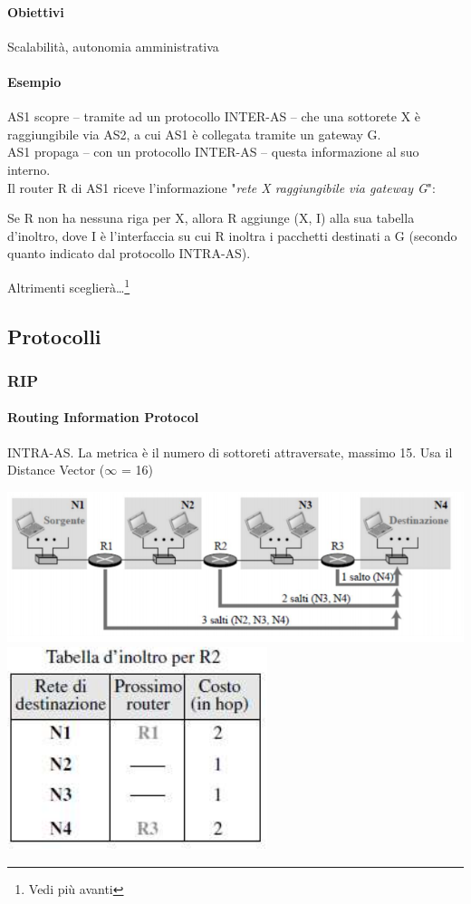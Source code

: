 \documentclass[10pt]{article}
\begin{document}
\paragraph{Obiettivi} Scalabilità, autonomia amministrativa
\paragraph{Esempio} AS1 scopre -- tramite ad un protocollo INTER-AS -- che una sottorete X è raggiungibile via AS2, a cui AS1 è collegata tramite un gateway G.\\
AS1 propaga -- con un protocollo INTER-AS -- questa informazione al suo interno.\\
Il router R di AS1 riceve l'informazione "\textit{rete X raggiungibile via gateway G}":

Se R non ha nessuna riga per X, allora R aggiunge (X, I) alla sua tabella d'inoltro, dove I è l'interfaccia su cui R inoltra i pacchetti destinati a G (secondo quanto indicato dal protocollo INTRA-AS).

Altrimenti sceglierà\ldots\footnote{Vedi più avanti}
\subsection{Protocolli}
\subsubsection{RIP}
\paragraph{Routing Information Protocol} INTRA-AS. La metrica è il numero di sottoreti attraversate, massimo 15. Usa il Distance Vector ($\infty$ = 16)
\begin{center}
\includegraphics[scale=0.7]{rip.png}\\
\includegraphics[scale=0.6]{riptab.png}
\end{center}
\end{document}
